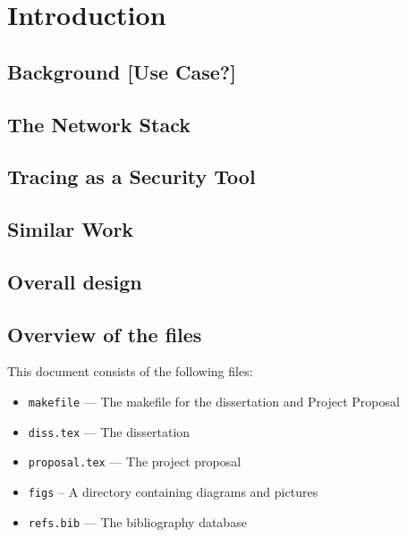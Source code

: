 \documentclass[a4paper,12pt,twoside,openright]{report}
\begin{document}
	
	\pagestyle{headings}
	
	\chapter{Introduction}
	
	\section{Background [Use Case?]}
	
	\section{The Network Stack}
	
	\section{Tracing as a Security Tool}
	
	\section{Similar Work}
	
	\section{Overall design}
	
	
	\section{Overview of the files}
	
	This document consists of the following files:
	
	\begin{itemize}
		\item \texttt{makefile} --- The makefile for the dissertation and
		Project Proposal
		\item \texttt{diss.tex} --- The dissertation
		\item \texttt{proposal.tex}  --- The project proposal 
		\item \texttt{figs} -- A directory containing diagrams and pictures
		\item \texttt{refs.bib} --- The bibliography database
	\end{itemize}
	
\end{document}
